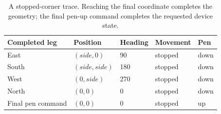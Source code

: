 \begin{table}[htbp]
  \centering
  \small
  \begin{tabular}{lllll}
    \toprule
    Completed leg     & Position      & Heading & Movement & Pen  \\
    \midrule
    East              & $(side,0)$    & 90      & stopped  & down \\
    South             & $(side,side)$ & 180     & stopped  & down \\
    West              & $(0,side)$    & 270     & stopped  & down \\
    North             & $(0,0)$       & 0       & stopped  & down \\
    Final pen command & $(0,0)$       & 0       & stopped  & up   \\
    \bottomrule
  \end{tabular}
  \caption{A stopped-corner trace. Reaching the final coordinate completes the geometry; the final pen-up command completes the requested device state.}
  \label{tab:revision-marsbot-corners}
\end{table}
